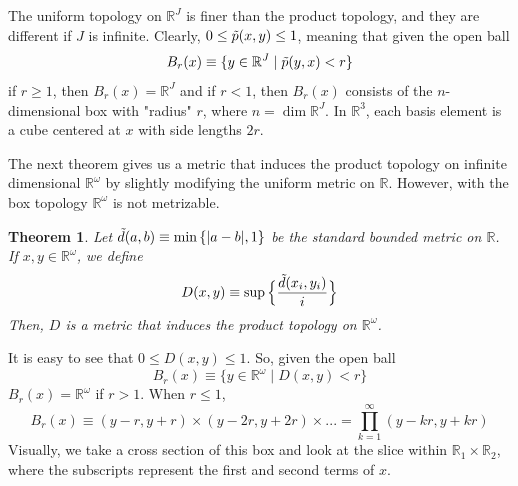 \documentclass{article}
\newtheorem{theorem}{Theorem}[section]
\theoremstyle{remark}
\theoremstyle{definition}
\begin{document}
The uniform topology on $\mathbb{R}^J$ is finer than the product topology, and they are different if $J$ is infinite. Clearly, $0 \leq \Tilde{p} (x, y) \leq 1$, meaning that given the open ball
\[B_r (x) \equiv \{y \in \mathbb{R}^J \;|\; \Tilde{p}(y, x) < r\}\]
if $r \geq 1$, then $B_r (x) = \mathbb{R}^J$ and if $r<1$, then $B_r (x)$ consists of the $n$-dimensional box with "radius" $r$, where $n = \dim{\mathbb{R}^J}$. In $\mathbb{R}^3$, each basis element is a cube centered at $x$ with side lengths $2r$.
\begin{center}
\end{center}

The next theorem gives us a metric that induces the product topology on infinite dimensional $\mathbb{R}^\omega$ by slightly modifying the uniform metric on $\mathbb{R}$. However, with the box topology $\mathbb{R}^\omega$ is not metrizable. 

\begin{theorem}
Let $\Tilde{d} (a, b) \equiv \min{\{|a-b|, 1\}}$ be the standard bounded metric on $\mathbb{R}$. If $x, y \in \mathbb{R}^\omega$, we define
\[ D(x, y) \equiv \sup{\Big\{ \frac{\Tilde{d}(x_i, y_i)}{i}\Big\}}\]
Then, $D$ is a metric that induces the product topology on $\mathbb{R}^\omega$. 
\end{theorem}
It is easy to see that $0 \leq D(x, y) \leq 1$. So, given the open ball
\[B_r (x) \equiv \{y \in \mathbb{R}^\omega \; | \; D(x, y) < r\}\]
$B_r (x) = \mathbb{R}^\omega$ if $r > 1$. When $r \leq 1$, 
\[B_r (x) \equiv (y-r, y+r) \times (y-2r, y+2r) \times ... = \prod_{k=1}^\infty (y - k r , y + k r)\]
Visually, we take a cross section of this box and look at the slice within $\mathbb{R}_1 \times \mathbb{R}_2$, where the subscripts represent the first and second terms of $x$. 
\begin{center}
\end{center}
\end{document}
